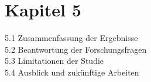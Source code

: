 \chapter{Kapitel 5}

5.1 Zusammenfassung der Ergebnisse\\
5.2 Beantwortung der Forschungsfragen\\
5.3 Limitationen der Studie\\
5.4 Ausblick und zukünftige Arbeiten